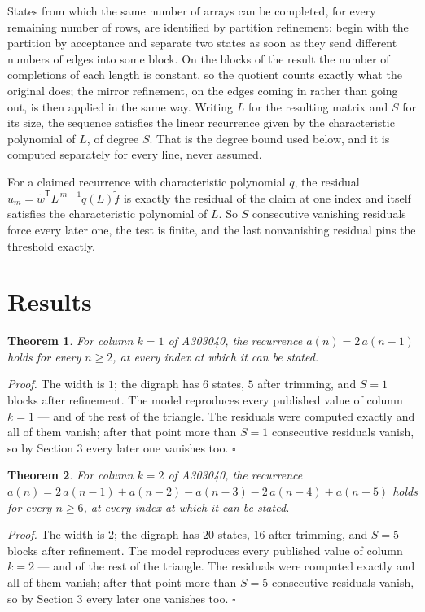 \documentclass[11pt]{article}
\newtheorem{theorem}{Theorem}
\theoremstyle{definition}
\begin{document}
States from which the same number of arrays can be completed, for every remaining number of rows, are identified by partition refinement: begin with the partition by acceptance and separate two states as soon as they send different numbers of edges into some block. On the blocks of the result the number of completions of each length is constant, so the quotient counts exactly what the original does; the mirror refinement, on the edges coming in rather than going out, is then applied in the same way. Writing $L$ for the resulting matrix and $S$ for its size, the sequence satisfies the linear recurrence given by the characteristic polynomial of $L$, of degree $S$. That is the degree bound used below, and it is computed separately for every line, never assumed.

For a claimed recurrence with characteristic polynomial $q$, the residual $u_m = \tilde w^{\mathsf T}L^{\,m-1}q(L)\tilde f$ is exactly the residual of the claim at one index and itself satisfies the characteristic polynomial of $L$. So $S$ consecutive vanishing residuals force every later one, the test is finite, and the last nonvanishing residual pins the threshold exactly.

\section{Results}

\begin{theorem} For column $k = 1$ of A303040, the recurrence $a(n) = 2\,a(n-1)$ holds for every $n \ge 2$, at every index at which it can be stated.\end{theorem}

{\itshape Proof.} The width is $1$; the digraph has $6$ states, $5$ after trimming, and $S = 1$ blocks after refinement. The model reproduces every published value of column $k = 1$ --- and of the rest of the triangle. The residuals were computed exactly and all of them vanish; after that point more than $S = 1$ consecutive residuals vanish, so by Section 3 every later one vanishes too. $\square$

\begin{theorem} For column $k = 2$ of A303040, the recurrence $a(n) = 2\,a(n-1) + a(n-2) - a(n-3) - 2\,a(n-4) + a(n-5)$ holds for every $n \ge 6$, at every index at which it can be stated.\end{theorem}

{\itshape Proof.} The width is $2$; the digraph has $20$ states, $16$ after trimming, and $S = 5$ blocks after refinement. The model reproduces every published value of column $k = 2$ --- and of the rest of the triangle. The residuals were computed exactly and all of them vanish; after that point more than $S = 5$ consecutive residuals vanish, so by Section 3 every later one vanishes too. $\square$
\end{document}
